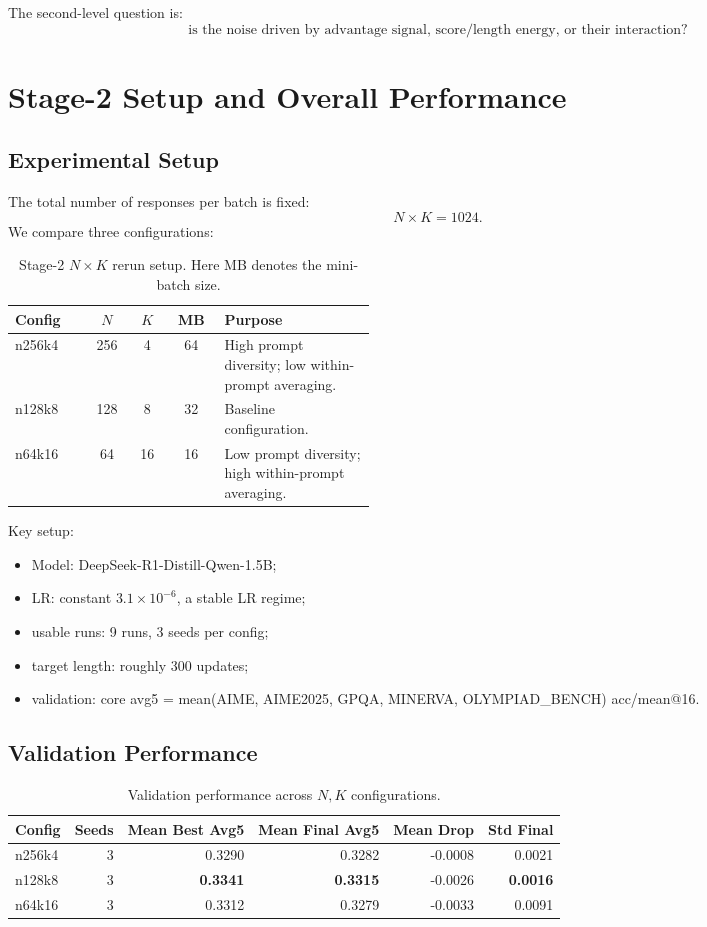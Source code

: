 \documentclass[11pt,a4paper]{article}
\begin{document}
The second-level question is:
\[
\boxed{
\text{is the noise driven by advantage signal, score/length energy, or their interaction?}
}
\]

\section{Stage-2 Setup and Overall Performance}

\subsection{Experimental Setup}

The total number of responses per batch is fixed:
\[
N\times K=1024.
\]
We compare three configurations:

\begin{table}[htbp]
\centering
\small
\begin{tabular}{@{}lccc>{\raggedright\arraybackslash}p{0.42\linewidth}@{}}
\toprule
Config & \(N\) & \(K\) & MB & Purpose \\
\midrule
n256k4 & 256 & 4  & 64 & High prompt diversity; low within-prompt averaging.\\
n128k8 & 128 & 8  & 32 & Baseline configuration.\\
n64k16 & 64  & 16 & 16 & Low prompt diversity; high within-prompt averaging.\\
\bottomrule
\end{tabular}
\caption{Stage-2 \(N\times K\) rerun setup. Here MB denotes the mini-batch size.}
\end{table}

Key setup:
\begin{itemize}[leftmargin=2em]
    \item Model: DeepSeek-R1-Distill-Qwen-1.5B;
    \item LR: constant \(3.1\times10^{-6}\), a stable LR regime;
    \item usable runs: 9 runs, 3 seeds per config;
    \item target length: roughly 300 updates;
    \item validation: core avg5 = mean(AIME, AIME2025, GPQA, MINERVA, OLYMPIAD\_BENCH) acc/mean@16.
\end{itemize}

\subsection{Validation Performance}

\begin{table}[h]
\centering
\begin{tabular}{lrrrrr}
\toprule
Config & Seeds & Mean Best Avg5 & Mean Final Avg5 & Mean Drop & Std Final\\
\midrule
n256k4 & 3 & 0.3290 & 0.3282 & -0.0008 & 0.0021\\
n128k8 & 3 & \textbf{0.3341} & \textbf{0.3315} & -0.0026 & \textbf{0.0016}\\
n64k16 & 3 & 0.3312 & 0.3279 & -0.0033 & 0.0091\\
\bottomrule
\end{tabular}
\caption{Validation performance across \(N,K\) configurations.}
\end{table}
\end{document}
